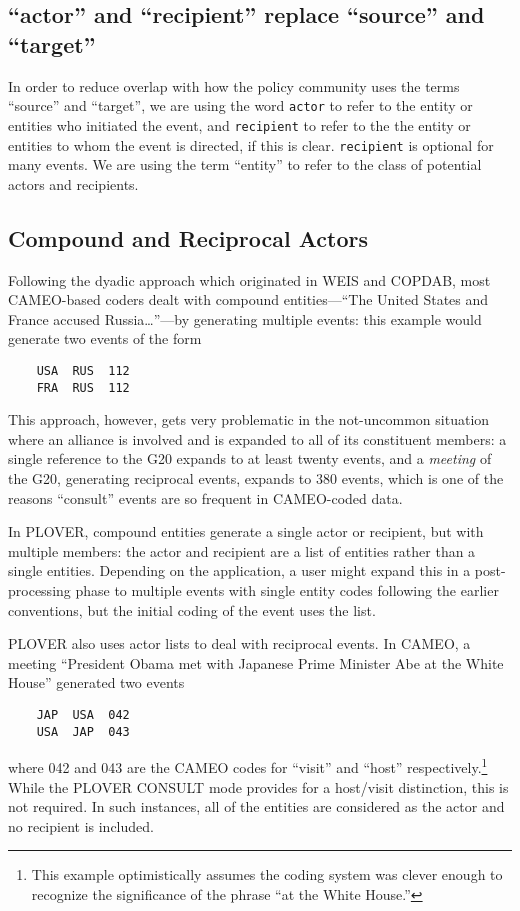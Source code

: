 \documentclass[11pt]{report}
\newcommand{\plcat}[1]{\textsf{#1}}
\newcommand{\txt}[1]{\texttt{#1}}
\begin{document}
\subsection{``actor'' and ``recipient'' replace ``source'' and ``target''}

In order to reduce overlap with how the policy community uses the terms  ``source'' and ``target'', we are using the word \txt{actor} to refer to the entity or entities who initiated the event, and \txt{recipient} to refer to the
 the entity or entities to whom the event is directed, if this is clear. \txt{recipient} is optional for many events. We are using the term ``entity'' to refer to the class of potential actors and recipients.

\subsection{Compound and Reciprocal Actors}\label{sec:recip}

Following the dyadic approach which originated in WEIS and COPDAB,  most CAMEO-based coders dealt with compound entities---``The United States and France accused Russia\ldots''---by generating multiple events: this example would generate two events of the form
\begin{verbatim}
	USA  RUS  112
	FRA  RUS  112
\end{verbatim}
This approach, however, gets very problematic in the not-uncommon situation where an alliance is involved and is expanded to all of its constituent members: a single reference to the G20 expands to at least twenty events, and a \textit{meeting} of the G20, generating reciprocal events, expands to 380 events, which is one of the reasons ``consult'' events are so frequent in CAMEO-coded data.

In PLOVER, compound entities generate a single actor or recipient, but with multiple members: the actor and recipient are a list of entities rather than a single entities. Depending on the application, a user might expand this in a post-processing phase to multiple events with single entity codes following the earlier conventions, but the initial coding of the event uses the list.

PLOVER also uses actor lists to deal with reciprocal events. In CAMEO, a meeting ``President Obama met with Japanese Prime Minister Abe at the White House'' generated two events
\begin{verbatim}
	JAP  USA  042
	USA  JAP  043
\end{verbatim}
where 042 and 043 are the CAMEO codes for ``visit'' and ``host'' respectively.\footnote{This example optimistically assumes the coding system was clever enough to recognize the significance of the phrase ``at the White House.''} While the PLOVER \plcat{CONSULT} mode provides for a host/visit distinction, this is not required. In such instances, all of the entities are considered as the actor and no recipient is included.
\end{document}
